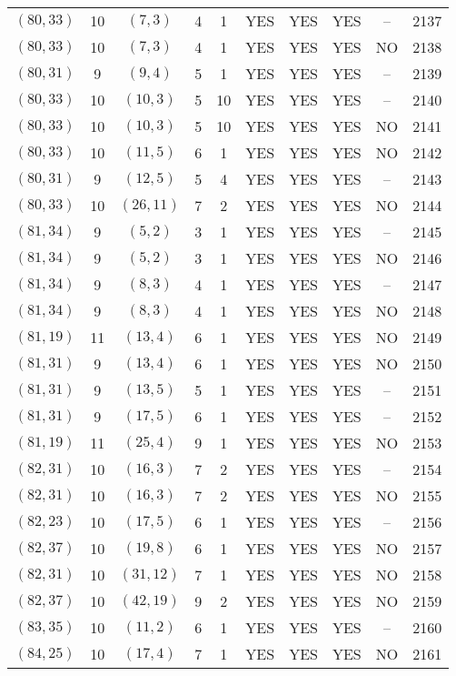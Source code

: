 \begin{longtable}{|c|c|c|c|c|c|c|c|c|c|}
$(80, 33)$ & 10 & $(7, 3)$ & 4 & 1 & YES & YES & YES & -- & 2137\\
$(80, 33)$ & 10 & $(7, 3)$ & 4 & 1 & YES & YES & YES & NO & 2138\\
$(80, 31)$ & 9 & $(9, 4)$ & 5 & 1 & YES & YES & YES & -- & 2139\\
$(80, 33)$ & 10 & $(10, 3)$ & 5 & 10 & YES & YES & YES & -- & 2140\\
$(80, 33)$ & 10 & $(10, 3)$ & 5 & 10 & YES & YES & YES & NO & 2141\\
$(80, 33)$ & 10 & $(11, 5)$ & 6 & 1 & YES & YES & YES & NO & 2142\\
$(80, 31)$ & 9 & $(12, 5)$ & 5 & 4 & YES & YES & YES & -- & 2143\\
$(80, 33)$ & 10 & $(26, 11)$ & 7 & 2 & YES & YES & YES & NO & 2144\\
$(81, 34)$ & 9 & $(5, 2)$ & 3 & 1 & YES & YES & YES & -- & 2145\\
$(81, 34)$ & 9 & $(5, 2)$ & 3 & 1 & YES & YES & YES & NO & 2146\\
$(81, 34)$ & 9 & $(8, 3)$ & 4 & 1 & YES & YES & YES & -- & 2147\\
$(81, 34)$ & 9 & $(8, 3)$ & 4 & 1 & YES & YES & YES & NO & 2148\\
$(81, 19)$ & 11 & $(13, 4)$ & 6 & 1 & YES & YES & YES & NO & 2149\\
$(81, 31)$ & 9 & $(13, 4)$ & 6 & 1 & YES & YES & YES & NO & 2150\\
$(81, 31)$ & 9 & $(13, 5)$ & 5 & 1 & YES & YES & YES & -- & 2151\\
$(81, 31)$ & 9 & $(17, 5)$ & 6 & 1 & YES & YES & YES & -- & 2152\\
$(81, 19)$ & 11 & $(25, 4)$ & 9 & 1 & YES & YES & YES & NO & 2153\\
$(82, 31)$ & 10 & $(16, 3)$ & 7 & 2 & YES & YES & YES & -- & 2154\\
$(82, 31)$ & 10 & $(16, 3)$ & 7 & 2 & YES & YES & YES & NO & 2155\\
$(82, 23)$ & 10 & $(17, 5)$ & 6 & 1 & YES & YES & YES & -- & 2156\\
$(82, 37)$ & 10 & $(19, 8)$ & 6 & 1 & YES & YES & YES & NO & 2157\\
$(82, 31)$ & 10 & $(31, 12)$ & 7 & 1 & YES & YES & YES & NO & 2158\\
$(82, 37)$ & 10 & $(42, 19)$ & 9 & 2 & YES & YES & YES & NO & 2159\\
$(83, 35)$ & 10 & $(11, 2)$ & 6 & 1 & YES & YES & YES & -- & 2160\\
$(84, 25)$ & 10 & $(17, 4)$ & 7 & 1 & YES & YES & YES & NO & 2161\\

\end{longtable}
